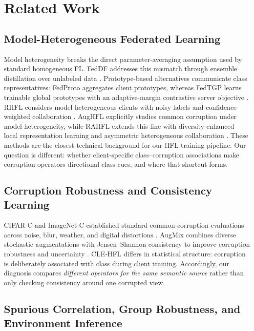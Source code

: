 \section{Related Work}

\subsection{Model-Heterogeneous Federated Learning}

Model heterogeneity breaks the direct parameter-averaging assumption used by standard homogeneous FL. FedDF addresses this mismatch through ensemble distillation over unlabeled data \citep{lin2020feddf}. Prototype-based alternatives communicate class representatives: FedProto aggregates client prototypes, whereas FedTGP learns trainable global prototypes with an adaptive-margin contrastive server objective \citep{tan2022fedproto,zhang2024fedtgp}. RHFL considers model-heterogeneous clients with noisy labels and confidence-weighted collaboration \citep{fang2022rhfl}. AugHFL explicitly studies common corruption under model heterogeneity, while RAHFL extends this line with diversity-enhanced local representation learning and asymmetric heterogeneous collaboration \citep{fang2023aughfl,fang2025rahfl}. These methods are the closest technical background for our HFL training pipeline. Our question is different: whether client-specific class--corruption associations make corruption operators directional class cues, and where that shortcut forms.

\subsection{Corruption Robustness and Consistency Learning}

CIFAR-C and ImageNet-C established standard common-corruption evaluations across noise, blur, weather, and digital distortions \citep{hendrycks2019corruptions}. AugMix combines diverse stochastic augmentations with Jensen--Shannon consistency to improve corruption robustness and uncertainty \citep{cubuk2020augmix}. CLE-HFL differs in statistical structure: corruption is deliberately associated with class during client training. Accordingly, our diagnosis compares \emph{different operators for the same semantic source} rather than only checking consistency around one corrupted view.

\subsection{Spurious Correlation, Group Robustness, and Environment Inference}

